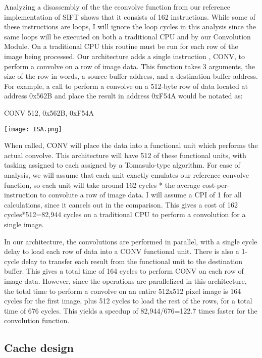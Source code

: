 Analyzing a disassembly of the the econvolve function from our reference implementation of SIFT shows that it consists of 162 instructions. While some of these instructions are loops, I will ignore the loop cycles in this analysis since the same loops will be executed on both a traditional CPU and by our Convolution Module. On a traditional CPU this routine must be run for each row of the image being processed. Our architecture adds a single instruction , CONV, to perform a convolve on a row of image data. This function takes 3 arguments, the size of the row in words, a source buffer address, and a destination buffer address. For example, a call to perform a convolve on a 512-byte row of data located at address 0x562B and place the result in address 0xF54A would be notated as:

CONV 512, 0x562B, 0xF54A

\begin{center}
\texttt{[image: ISA.png]}%
\label{fig:ISA}%
\end{center}

When called, CONV will place the data into a functional unit which performs the actual convolve. This architecture will have 512 of these functional units, with tasking assigned to each assigned by a Tomasulo-type algorithm. For ease of analysis, we will assume that each unit exactly emulates our reference convolve function, so each unit will take around 162 cycles * the average cost-per-instruction to convolute a row of image data. I will assume a CPI of 1 for all calculations, since it cancels out in the comparison. This gives a cost of 162 cycles*512=82,944 cycles on a traditional CPU to perform a convolution for a single image.

In our architecture, the convolutions are performed in parallel, with a single cycle delay to load each row of data into a CONV functional unit. There is also a 1-cycle delay to transfer each result from the functional unit to the destination buffer. This gives a total time of 164 cycles to perform CONV on each row of image data. However, since the operations are parallelized in this architecture, the total time to perform a convolve on an entire 512x512 pixel image is 164 cycles for the first image, plus 512 cycles to load the rest of the rows, for a total time of 676 cycles. This yields a speedup of 82,944/676=122.7 times faster for the convolution function.

\subsection{Cache design}
